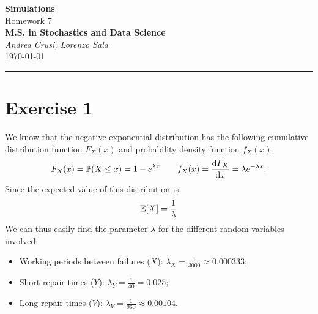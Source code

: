 \documentclass[12pt]{article}
\begin{document}
	\textcolor{UM_Brown}{
		\begin{center}
			\textbf{\Large Simulations}\\
			\vspace{5pt}
			Homework 7 \\
			\vspace{5pt}
			\textbf{M.S. in Stochastics and Data Science}\\
			\vspace{20pt}
			\textit{Andrea Crusi, Lorenzo Sala} \\
			\vspace{5pt}
			\today
		\end{center}
		\vspace{10pt}
		\hrule
	}
	
	
	
	\section{Exercise 1}
	We know that the negative exponential distribution has the following cumulative distribution function $F_X(x)$ and probability density function $f_X(x)$:
	\begin{equation*}
		F_X(x)=\mathbb{P}(X\leq x)=1-e^{\lambda x}\qquad f_X(x)=\frac{\mathop{}\!\mathrm{d} F_X}{\mathop{}\!\mathrm{d} x}=\lambda e^{-\lambda x}.
	\end{equation*}
	Since the expected value of this distribution is
	\begin{equation*}
		\mathbb{E}[X]=\frac{1}{\lambda}
	\end{equation*}
	We can thus easily find the parameter $\lambda$ for the different random variables involved:
	\begin{itemize}
		\item Working periods between failures ($X$): $\lambda_X=\frac{1}{3000}\approx0.000333$;
		\item Short repair times ($Y$): $\lambda_Y=\frac{1}{40}=0.025$;
		\item Long repair times ($V$): $\lambda_V=\frac{1}{960}\approx 0.00104$.
	\end{itemize}
\end{document}
